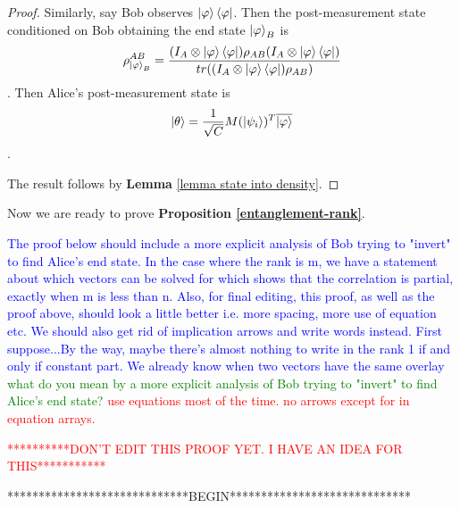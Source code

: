 \begin{proof}
Similarly, say Bob observes $\ket{\varphi}\bra{\varphi}$. Then the post-measurement state conditioned on Bob obtaining the end state $\ket{\varphi}_B$ is $$\rho_{\ket{\varphi}_B}^{AB}=\frac{(I_A \otimes \ket{\varphi}\bra{\varphi}  )\rho_{AB}(I_A \otimes \ket{\varphi}\bra{\varphi})}{tr((I_A \otimes \ket{\varphi}\bra{\varphi})\rho_{AB})}$$.
Then Alice's post-measurement state is $$\ket{\theta}=\frac{1}{\sqrt{C}} M(\ket{\psi_i})^T \overline{\ket{\varphi}}$$.

The result follows by {\bf{Lemma}} \ref{lemma state into density}.
\end{proof}

\bigskip
Now we are ready to prove \textbf{Proposition \ref{entanglement-rank}}.

\textcolor{blue}{The proof below should include a more explicit analysis of Bob trying to "invert" to find Alice's end state. In the case where the rank is m, we have a statement about which vectors can be solved for which shows that the correlation is partial, exactly when m is less than n.  Also, for final editing, this proof, as well as the proof above, should look a little better i.e. more spacing, more use of equation etc.  We should also get rid of implication arrows and write words instead.  First suppose...By the way, maybe there's almost nothing to write in the rank 1 if and only if constant part.  We already know when two vectors have the same overlay} \textcolor{green}{what do you mean by a more explicit analysis of Bob trying to "invert" to find Alice's end state?}
\textcolor{red}{use equations most of the time. no arrows except for in equation arrays.}


\textcolor{red}{**********DON'T EDIT THIS PROOF YET.  I HAVE AN IDEA FOR THIS***********}

\medskip

*****************************BEGIN*****************************


